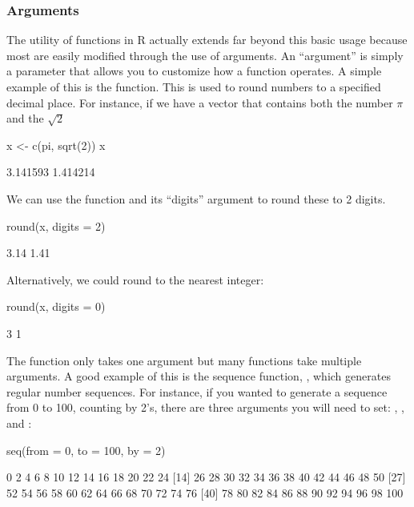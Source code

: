 \subsubsection{Arguments}
\label{sec:func_args}

The utility of functions in R actually extends far beyond this basic usage because most are easily modified through the use of \glspl{argument}. An ``argument'' is simply a parameter that allows you to customize how a function operates. A simple example of this is the  function.  This is used to round numbers to a specified decimal place. For instance, if we have a vector that contains both the number $\pi$ and the $\sqrt{2}$

\begin{inR}
x <- c(pi, sqrt(2))
x
\end{inR}
\begin{outR}
[1] 3.141593 1.414214
\end{outR}

\noindent
We can use the  function and its ``digits'' argument to round these to 2 digits.
\begin{inR}
round(x, digits = 2)
\end{inR}
\begin{outR}
[1] 3.14 1.41
\end{outR}

\noindent
Alternatively, we could round to the nearest integer:
\begin{inR}
round(x, digits = 0)
\end{inR}
\begin{outR}
[1] 3 1
\end{outR}

The  function only takes one argument but many functions take multiple arguments.  A good example of this is the sequence function, , which generates regular number sequences.  For instance, if you wanted to generate a sequence from 0 to 100, counting by 2's, there are three arguments you will need to set: , , and :

\begin{inR}
seq(from = 0, to = 100, by = 2)
\end{inR}
\begin{outR}
 [1]   0   2   4   6   8  10  12  14  16  18  20  22  24
[14]  26  28  30  32  34  36  38  40  42  44  46  48  50
[27]  52  54  56  58  60  62  64  66  68  70  72  74  76
[40]  78  80  82  84  86  88  90  92  94  96  98 100
\end{outR}

